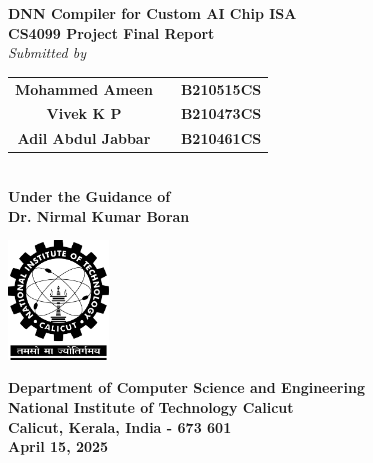 \documentclass[12pt]{report}
\begin{document}
\begin{titlepage}
\begin{center}
\vspace{1cm}
\huge
\textbf{DNN Compiler for Custom AI Chip ISA}\\

\normalsize
\textbf{CS4099 Project Final Report}\\
\vspace{1cm}
\emph{Submitted by}\\        
\vspace{0.5cm}
\begin{tabular}{ccc}
\textbf{Mohammed Ameen }&& \textbf{B210515CS}\\
\textbf{Vivek K P}&& \textbf{B210473CS}\\
\textbf{Adil Abdul Jabbar}&&\textbf{B210461CS} \\
\end{tabular}\\
\vspace{0.8cm}
\textbf{Under the Guidance of\\Dr. Nirmal Kumar Boran}\\
\vspace{0.8cm}
\begin{center}
 \includegraphics[width=0.2\textwidth]{nitc-logo.png}
\end{center}
\vspace{0.8cm}
\textbf{Department of Computer Science and Engineering}\\
\textbf{National Institute of Technology Calicut}\\
\textbf{Calicut, Kerala, India - 673 601}\\
\vspace{0.8cm}
\textbf{April 15, 2025}
\end{center}
\end{titlepage}
\end{document}

